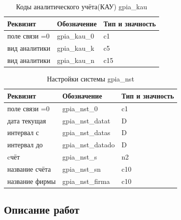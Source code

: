 \begin{table}[h!p]
    \centering
    \scriptsize
    \caption{Коды аналитического учёта(КАУ) gpia\_kau}
    \begin{tabular}{|l|l|l|} 

                                                                               \hline
\textbf{Реквизит}       &\textbf{Обозначение}   &\textbf{Тип и значность}   \\ \hline
поле связи          =0  &gpia\_kau\_0           &c1                         \\ \hline
вид аналитики           &gpia\_kau\_k           &c5                         \\ \hline
вид аналитики           &gpia\_kau\_n           &c15                        \\ \hline

    \end{tabular}
\end{table}

\begin{table}[h!p]
    \centering
    \scriptsize
    \caption{Настройки системы gpia\_nst}
    \begin{tabular}{|l|l|l|} 

                                                                               \hline
\textbf{Реквизит}       &\textbf{Обозначение}   &\textbf{Тип и значность}   \\ \hline
поле связи          =0  &gpia\_nst\_0           &c1                         \\ \hline
дата текущая            &gpia\_nst\_datat       &D                          \\ \hline
интервал с              &gpia\_nst\_datas       &D                          \\ \hline
интервал до             &gpia\_nst\_datado      &D                          \\ \hline
cчёт                    &gpia\_nst\_s           &n2                         \\ \hline
название счёта          &gpia\_nst\_sn          &c10                        \\ \hline
название фирмы          &gpia\_nst\_firma       &c10                        \\ \hline

    \end{tabular}
\end{table}

\subsection{Описание работ}

